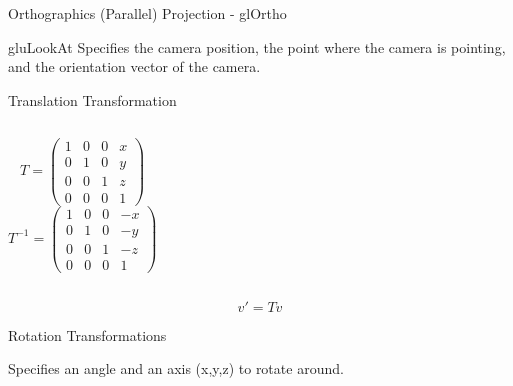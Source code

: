 \documentclass[xcolor=dvipsnames,t]{beamer}
\newcommand{\showcode}[1]{\begin{mdframed}[style=code] %
                          \end{mdframed}%
}
\begin{document}
\begin{frame}{Orthographics (Parallel) Projection - glOrtho} 
    \showcode{ortho.c} 
\end{frame} 

\begin{frame}{gluLookAt}
    Specifies the camera position, the point where the camera is pointing, 
    and the orientation vector of the camera.
    \showcode{lookat.c} 
\end{frame} 

\begin{frame}{Translation Transformation}
    \showcode{translate.c} 
    \begin{columns}[t]
            \begin{equation*}
                T = \left(
                        \begin{array}{cccc}
                            1   & 0     & 0     & x \\
                            0   & 1     & 0     & y \\
                            0   & 0     & 1     & z \\
                            0   & 0     & 0     & 1
                        \end{array} 
                    \right)
            \end{equation*} 
            \begin{equation*}
               T^{-1} = \left(
                        \begin{array}{cccc}
                            1   & 0     & 0     & -x \\
                            0   & 1     & 0     & -y \\
                            0   & 0     & 1     & -z \\
                            0   & 0     & 0     &  1
                        \end{array} 
                    \right)
            \end{equation*} 
    \end{columns} 
    \begin{equation*}
        v' = T v
    \end{equation*} 
\end{frame} 

\begin{frame}{Rotation Transformations} 
    \showcode{rotate.c} 
    Specifies an angle and an axis (x,y,z) to rotate around.
\end{frame} 
\end{document}
